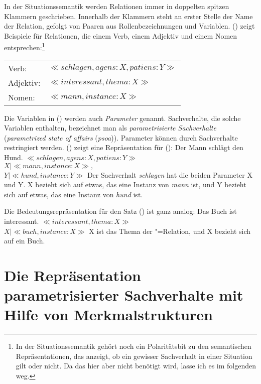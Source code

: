 
In der Situationssemantik werden Relationen immer in doppelten spitzen Klammern
geschrieben. Innerhalb der Klammern steht an erster Stelle der Name der Relation, gefolgt
von Paaren aus Rollenbezeichnungen und Variablen. () zeigt Beispiele für Relationen, die einem Verb, einem Adjektiv
und einem Nomen entsprechen:\footnote{
  In der Situationssemantik gehört noch ein Polaritätsbit zu den semantischen Repräsentationen, das
  anzeigt, ob ein gewisser Sachverhalt in einer Situation gilt oder nicht.
  Da das hier aber nicht benötigt wird, lasse ich es im folgenden weg.%
}
\ea{}
\begin{tabular}[t]{@{}ll}
Verb:     & $\ll schlagen, agens:X, patiens:Y\gg$\\
Adjektiv: & $\ll interessant, thema: X\gg$\\
Nomen:    & $\ll mann, instance: X\gg$\\
\end{tabular}
\z
Die Variablen in () werden auch \emph{Parameter} genannt. Sachverhalte,
die solche Variablen enthalten, bezeichnet man als 
\emph{parametrisierte Sachverhalte}
(\emph{parametrized state of affairs} (\emph{psoa}))\label{page-psoa}. Parameter
können durch Sachverhalte restringiert werden. () zeigt eine Repräsentation
für ():
\ea
\label{bsp-mann-schlaegt-hund}
Der Mann schlägt den Hund.
\z
\ea
\label{ex-sachverhalt}
$\ll schlagen, agens:X, patiens:Y\gg$\\
$X|\ll mann, instance:X\gg,$\\
$Y|\ll hund, instance:Y\gg$
\z
Der Sachverhalt \emph{schlagen} hat die beiden Parameter X und Y. X
bezieht sich auf etwas, das eine Instanz von \emph{mann} ist, und Y bezieht
sich auf etwas, das eine Instanz von \emph{hund} ist.

Die Bedeutungsrepräsentation für den Satz () ist ganz analog:
\ea
Das Buch ist interessant.
\z
\ea
$\ll interessant, thema:X\gg$\\
$X|\ll buch, instance:X\gg$
\z
X ist das Thema der "=Relation,
und X bezieht sich auf ein Buch.

\section{Die Repräsentation parametrisierter Sachverhalte mit Hilfe von Merkmalstrukturen}
\label{sec-rep-semantik-merkmalstruktur}

